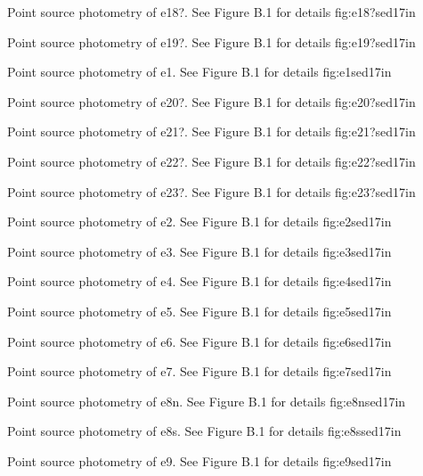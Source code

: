{Point source photometry of e18?.  See Figure B.1 for
details}
{fig:e18?sed}{1}{7in}
\clearpage

{Point source photometry of e19?.  See Figure B.1 for
details}
{fig:e19?sed}{1}{7in}
\clearpage

{Point source photometry of e1.  See Figure B.1 for
details}
{fig:e1sed}{1}{7in}
\clearpage

{Point source photometry of e20?.  See Figure B.1 for
details}
{fig:e20?sed}{1}{7in}
\clearpage

{Point source photometry of e21?.  See Figure B.1 for
details}
{fig:e21?sed}{1}{7in}
\clearpage

{Point source photometry of e22?.  See Figure B.1 for
details}
{fig:e22?sed}{1}{7in}
\clearpage

{Point source photometry of e23?.  See Figure B.1 for
details}
{fig:e23?sed}{1}{7in}
\clearpage

{Point source photometry of e2.  See Figure B.1 for
details}
{fig:e2sed}{1}{7in}
\clearpage

{Point source photometry of e3.  See Figure B.1 for
details}
{fig:e3sed}{1}{7in}
\clearpage

{Point source photometry of e4.  See Figure B.1 for
details}
{fig:e4sed}{1}{7in}
\clearpage

{Point source photometry of e5.  See Figure B.1 for
details}
{fig:e5sed}{1}{7in}
\clearpage

{Point source photometry of e6.  See Figure B.1 for
details}
{fig:e6sed}{1}{7in}
\clearpage

{Point source photometry of e7.  See Figure B.1 for
details}
{fig:e7sed}{1}{7in}
\clearpage

{Point source photometry of e8n.  See Figure B.1 for
details}
{fig:e8nsed}{1}{7in}
\clearpage

{Point source photometry of e8s.  See Figure B.1 for
details}
{fig:e8ssed}{1}{7in}
\clearpage

{Point source photometry of e9.  See Figure B.1 for
details}
{fig:e9sed}{1}{7in}
\clearpage



